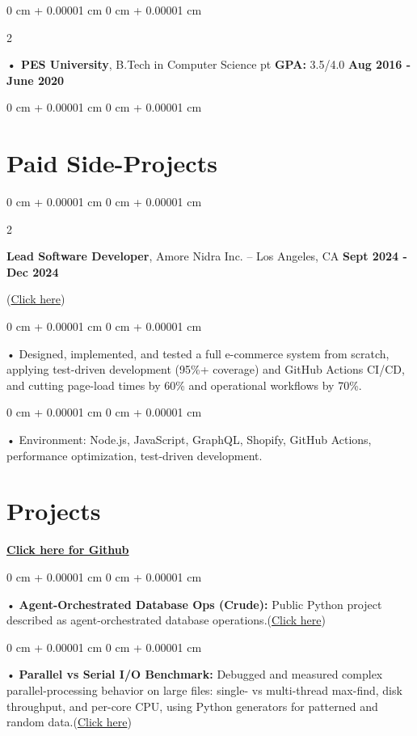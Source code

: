 \documentclass[10pt, letterpaper]{article}
\newenvironment{onecolentry}{
    \begin{adjustwidth}{
        0 cm + 0.00001 cm
    }{
        0 cm + 0.00001 cm
    }
}{
    \end{adjustwidth}
} %
\newenvironment{twocolentry}[2][]{
    \onecolentry
    \def\secondColumn{#2}
    \setcolumnwidth{\fill, 4.5 cm}
    \begin{paracol}{2}
}{
    \switchcolumn \raggedleft \secondColumn
    \end{paracol}
    \endonecolentry
} %
\begin{document}
        \begin{twocolentry}{
            \textbf{Aug 2016 - June 2020}
        }
            \textbf{ • PES University}, B.Tech in Computer Science  pt \textbf{GPA:} 3.5/4.0  \end{twocolentry}
        \begin{onecolentry}

                        \vspace{0.4cm}
    \section{Paid Side-Projects}
            \vspace{2 pt }
        \begin{twocolentry}{
            \textbf{Sept 2024 - Dec 2024}
        }
            \textbf{Lead Software Developer}, Amore Nidra Inc. -- Los Angeles, CA\end{twocolentry}(\href{https://amorenidra.com}{Click here})

        \begin{onecolentry}
             • Designed, implemented, and tested a full e-commerce system from scratch, applying test-driven development (95\%+ coverage) and GitHub Actions CI/CD, and cutting page-load times by 60\% and operational workflows by 70\%.
        \end{onecolentry}
        \begin{onecolentry}
             • Environment: Node.js, JavaScript, GraphQL, Shopify, GitHub Actions, performance optimization, test-driven development.
        \end{onecolentry}
             \vspace{2 pt }

        \vspace{0.4cm}
\section{Projects}
    \vspace{2 pt}
\end{onecolentry}
\textbf{\href{https://github.com/daedalus-s}{Click here for Github}}
\begin{onecolentry}
     • \textbf{Agent-Orchestrated Database Ops (Crude):} Public Python project described as agent-orchestrated database operations.(\href{https://github.com/daedalus-s/Crude}{Click here})
\end{onecolentry}
\begin{onecolentry}
     • \textbf{Parallel vs Serial I/O Benchmark:} Debugged and measured complex parallel-processing behavior on large files: single- vs multi-thread max-find, disk throughput, and per-core CPU, using Python generators for patterned and random data.(\href{https://github.com/daedalus-s/parallelvsserial}{Click here})
\end{onecolentry}
\end{document}
